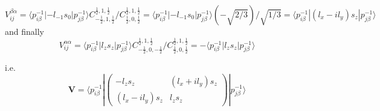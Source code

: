 \documentclass{article}
\begin{document}
\begin{equation}
 V^{\beta\alpha}_{ij}  = \langle p_{i\beta}^{-1}|-l_{-1} s_{0} |p_{j\beta }^{-1}\rangle 
                         C^{\frac 1 2,1,\frac 1 2}_{-\frac 1 2,1,\frac 1 2}/
                         C^{\frac 1 2,1,\frac 1 2}_{\frac 1 2, 0,\frac 1 2}
                       = \langle p_{i\beta}^{-1}|-l_{-1} s_{0} |p_{j\beta }^{-1}\rangle (-\sqrt{2/3})/\sqrt{1/3}
                       = \langle p_{i\beta}^{-1}|(l_x-il_y) s_z |p_{j\beta }^{-1}\rangle
\end{equation}
and finally 
\begin{equation}
 V^{\alpha\alpha}_{ij}  =  \langle p_{i\beta}^{-1}|l_z s_z |p_{j\beta}^{-1}\rangle
                         C^{\frac 1 2,1,\frac 1 2}_{-\frac 1 2, 0,-\frac 1 2}/
                         C^{\frac 1 2,1,\frac 1 2}_{\frac 1 2, 0,\frac 1 2}
 = - \langle p_{i\beta}^{-1}|l_z s_z |p_{j\beta}^{-1}\rangle
\end{equation}

i.e.
\begin{equation}
 \mathbf{V}  =
    \langle 
        p_{i\beta}^{-1}  |
         \begin{pmatrix} 
            -l_z s_z &(l_x + i l_y)s_z \\
            (l_x-il_y)s_z & l_z s_z
        \end{pmatrix}
        | p_{j\beta}^{-1}
    \rangle 
\end{equation}
\end{document}

